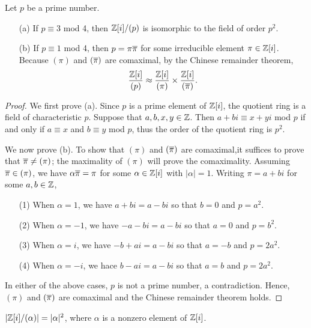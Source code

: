 \begin{prop}
    Let $p$ be a prime number.
    \begin{enumerate}
        \item[(a)]
        {
            If $p\equiv 3$ mod 4, then ${\mathbb{Z}}[i]/(p)$ is isomorphic to the field of order $p^2$.
        }
        \item[(b)]
        {
            If $p\equiv 1$ mod 4, then $p=\pi\overline{\pi}$ for some irreducible element $\pi\in{\mathbb{Z}}[i]$.
            Because $(\pi)$ and $(\overline{\pi})$ are comaximal, by the Chinese remainder theorem,
            \begin{align*}
                \frac{{\mathbb{Z}}[i]}{(p)}\approx\frac{{\mathbb{Z}}[i]}{(\pi)}\times\frac{{\mathbb{Z}}[i]}{(\overline{\pi})}.
            \end{align*}
        }
    \end{enumerate}
\end{prop}
\begin{proof}
    We first prove (a).
    Since $p$ is a prime element of ${\mathbb{Z}}[i]$, the quotient ring is a field of characteristic $p$.
    Suppose that $a, b, x, y\in{\mathbb{Z}}$.
    Then $a+bi\equiv x+yi$ mod $p$ if and only if $a\equiv x$ and $b\equiv y$ mod $p$, thus the order of the quotient ring is $p^2$.

    We now prove (b).
    To show that $(\pi)$ and $(\overline{\pi})$ are comaximal,it suffices to prove that $\overline{\pi}\neq(\pi)$; the maximality of $(\pi)$ will prove the comaximality.
    Assuming $\overline{\pi}\in(\pi)$, we have $\alpha\overline{\pi}=\pi$ for some $\alpha\in{\mathbb{Z}}[i]$ with $|\alpha|=1$.
    Writing $\pi=a+bi$ for some $a, b\in{\mathbb{Z}}$,
    \begin{enumerate}
        \item[(1)]
        {
            When $\alpha=1$, we have $a+bi=a-bi$ so that $b=0$ and $p=a^2$.
        }
        \item[(2)]
        {
            When $\alpha=-1$, we have $-a-bi=a-bi$ so that $a=0$ and $p=b^2$.
        }
        \item[(3)]
        {
            When $\alpha=i$, we have $-b+ai=a-bi$ so that $a=-b$ and $p=2a^2$.
        }
        \item[(4)]
        {
            When $\alpha=-i$, we hace $b-ai=a-bi$ so that $a=b$ and $p=2a^2$.
        }
    \end{enumerate}
    In either of the above cases, $p$ is not a prime number, a contradiction.
    Hence, $(\pi)$ and $(\overline{\pi})$ are comaximal and the Chinese remainder theorem holds.
\end{proof}

\begin{thm}
    $|{\mathbb{Z}}[i]/(\alpha)|=|\alpha|^2$, where $\alpha$ is a nonzero element of ${\mathbb{Z}}[i]$.
\end{thm}
